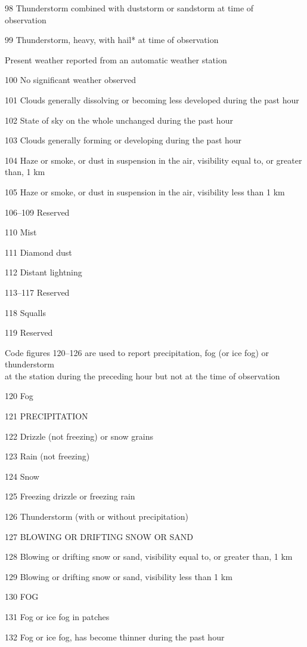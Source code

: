 98 Thunderstorm combined with duststorm or sandstorm at time of\\
observation

99 Thunderstorm, heavy, with hail* at time of observation

Present weather reported from an automatic weather station

100 No significant weather observed

101 Clouds generally dissolving or becoming less developed during the past hour

102 State of sky on the whole unchanged during the past hour

103 Clouds generally forming or developing during the past hour

104 Haze or smoke, or dust in suspension in the air, visibility equal to, or greater than, 1 km

105 Haze or smoke, or dust in suspension in the air, visibility less than 1 km

106--109 Reserved

110 Mist

111 Diamond dust

112 Distant lightning

113--117 Reserved

118 Squalls

119 Reserved

Code figures 120--126 are used to report precipitation, fog (or ice fog) or thunderstorm\\
at the station during the preceding hour but not at the time of observation

120 Fog

121 PRECIPITATION

122 Drizzle (not freezing) or snow grains

123 Rain (not freezing)

124 Snow

125 Freezing drizzle or freezing rain

126 Thunderstorm (with or without precipitation)

127 BLOWING OR DRIFTING SNOW OR SAND

128 Blowing or drifting snow or sand, visibility equal to, or greater than, 1 km

129 Blowing or drifting snow or sand, visibility less than 1 km

130 FOG

131 Fog or ice fog in patches

132 Fog or ice fog, has become thinner during the past hour

